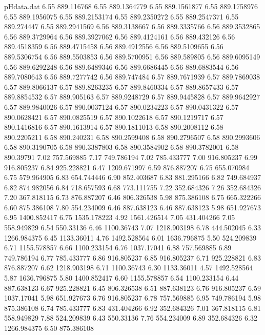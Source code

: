 \begin{filecontents}{pHdata.dat}
6.55 	889.116768
6.55 	889.1364779
6.55 	889.1561877
6.55 	889.1758976
6.55 	889.1956075
6.55 	889.2153174
6.55 	889.2350272
6.55 	889.2547371
6.55 	889.274447
6.55 	889.2941569
6.56 	889.3138667
6.56 	889.3335766
6.56 	889.3532865
6.56 	889.3729964
6.56 	889.3927062
6.56 	889.4124161
6.56 	889.432126
6.56 	889.4518359
6.56 	889.4715458
6.56 	889.4912556
6.56 	889.5109655
6.56 	889.5306754
6.56 	889.5503853
6.56 	889.5700951
6.56 	889.589805
6.56 	889.6095149
6.56 	889.6292248
6.56 	889.6489346
6.56 	889.6686445
6.56 	889.6883544
6.56 	889.7080643
6.56 	889.7277742
6.56 	889.747484
6.57 	889.7671939
6.57 	889.7869038
6.57 	889.8066137
6.57 	889.8263235
6.57 	889.8460334
6.57 	889.8657433
6.57 	889.8854532
6.57 	889.905163
6.57 	889.9248729
6.57 	889.9445828
6.57 	889.9642927
6.57 	889.9840026
6.57 	890.0037124
6.57 	890.0234223
6.57 	890.0431322
6.57 	890.0628421
6.57 	890.0825519
6.57 	890.1022618
6.57 	890.1219717
6.57 	890.1416816
6.57 	890.1613914
6.57 	890.1811013
6.58 	890.2008112
6.58 	890.2205211
6.58 	890.240231
6.58 	890.2599408
6.58 	890.2796507
6.58 	890.2993606
6.58 	890.3190705
6.58 	890.3387803
6.58 	890.3584902
6.58 	890.3782001
6.58 	890.39791
7.02 	757.569885
7.17 	749.786194
7.02 	785.433777
7.00 	916.805237
6.99 	916.805237
6.84 	925.228821
6.47 	1209.671997
6.59 	876.887207
6.75 	655.070984
6.75 	579.964905
6.83 	654.744446
6.90 	852.403687
6.83 	881.295166
6.82 	749.684937
6.82 	874.982056
6.84 	718.657593
6.68 	773.111755
7.22 	352.684326
7.26 	352.684326
7.20 	367.818115
6.73 	876.887207
6.46 	806.326538
5.98 	875.386108
6.75 	665.322266
6.60 	875.386108
7.80 	554.234009
6.46 	887.638123
6.46 	887.638123
5.98 	651.927673
6.95 	1400.852417
6.75 	1535.178223
4.92 	1561.426514
7.05 	431.404266
7.05 	558.949829
6.54 	550.33136
6.46 	1100.36743
7.07 	1218.903198
6.78 	444.502045
6.33 	1266.984375
6.45 	1133.36011
4.76 	1492.528564
6.01 	1636.796875
5.50 	524.209839
6.71 	1155.578857
6.66 	1100.233154
6.76 	1037.17041
6.88 	757.569885
6.89 	749.786194
6.77 	785.433777
6.86 	916.805237
6.85 	916.805237
6.71 	925.228821
6.83 	876.887207
6.62 	1218.903198
6.71 	1100.36743
6.30 	1133.36011
4.57 	1492.528564
5.87 	1636.796875
5.80 	1400.852417
6.60 	1155.578857
6.54 	1100.233154
6.44 	887.638123
6.67 	925.228821
6.45 	806.326538
6.51 	887.638123
6.76 	916.805237
6.59 	1037.17041
5.98 	651.927673
6.76 	916.805237
6.78 	757.569885
6.95 	749.786194
5.98 	875.386108
6.74 	785.433777
6.83 	431.404266
6.92 	352.684326
7.01 	367.818115
6.81 	558.949829
7.88 	524.209839
6.43 	550.33136
7.76 	554.234009
6.89 	352.684326
6.32 	1266.984375
6.50 	875.386108

\end{filecontents}
